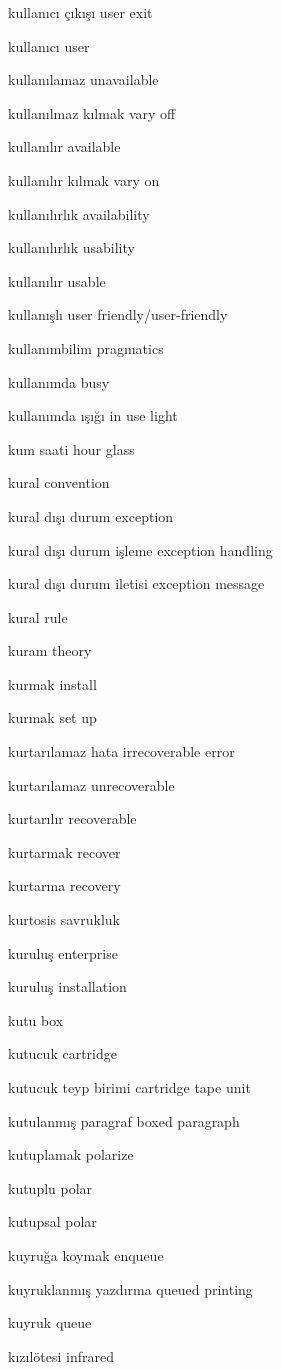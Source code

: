\documentclass[12pt,fleqn]{article}\usepackage{../../common}
\begin{document}
kullanıcı çıkışı user exit

kullanıcı user

kullanılamaz unavailable

kullanılmaz kılmak vary off

kullanılır available

kullanılır kılmak vary on

kullanılırlık availability

kullanılırlık usability

kullanılır usable

kullanışlı user friendly/user-friendly

kullanımbilim pragmatics

kullanımda busy

kullanımda ışığı in use light

kum saati hour glass

kural convention

kural dışı durum exception

kural dışı durum işleme exception handling

kural dışı durum iletisi exception message

kural rule

kuram theory

kurmak install

kurmak set up

kurtarılamaz hata irrecoverable error

kurtarılamaz unrecoverable

kurtarılır recoverable

kurtarmak recover

kurtarma recovery

kurtosis savrukluk

kuruluş enterprise

kuruluş installation

kutu box

kutucuk cartridge

kutucuk teyp birimi cartridge tape unit

kutulanmış paragraf boxed paragraph

kutuplamak polarize

kutuplu polar

kutupsal polar

kuyruğa koymak enqueue

kuyruklanmış yazdırma queued printing

kuyruk queue

kızılötesi infrared
\end{document}
